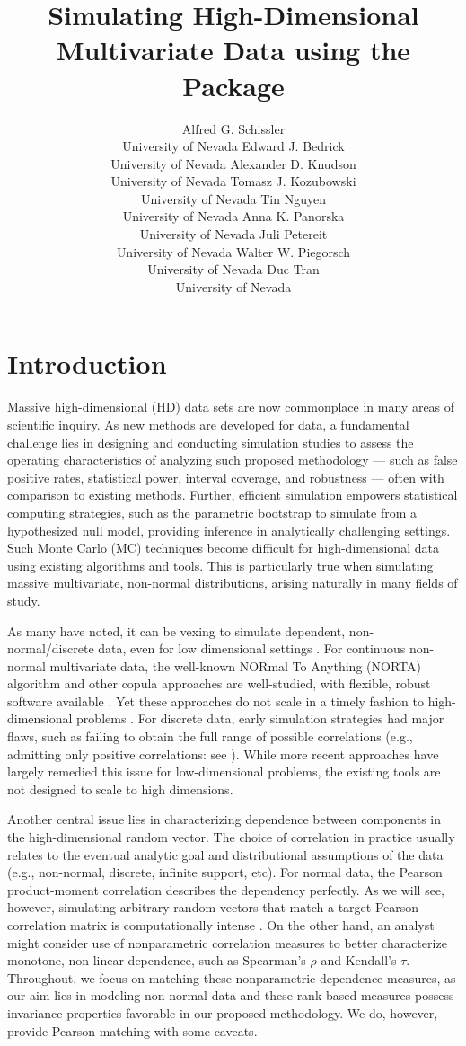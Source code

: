 \documentclass[
]{jss}
\author{
Alfred G. Schissler\\University of Nevada \And Edward J.
Bedrick\\University of Nevada \And Alexander D. Knudson\\University of
Nevada \AND Tomasz J. Kozubowski\\University of Nevada \And Tin
Nguyen\\University of Nevada \And Anna K. Panorska\\University of Nevada
\AND Juli Petereit\\University of Nevada \And Walter W.
Piegorsch\\University of Nevada \And Duc Tran\\University of Nevada
}
\title{Simulating High-Dimensional Multivariate Data using the
\pkg{Bigsimr} Package}
\begin{document}
\newpage


\hypertarget{introduction}{%
\section{Introduction}\label{introduction}}

Massive high-dimensional (HD) data sets are now commonplace in many
areas of scientific inquiry. As new methods are developed for data, a
fundamental challenge lies in designing and conducting simulation
studies to assess the operating characteristics of analyzing such
proposed methodology --- such as false positive rates, statistical
power, interval coverage, and robustness --- often with comparison to
existing methods. Further, efficient simulation empowers statistical
computing strategies, such as the parametric bootstrap
\citep{Chernick2008} to simulate from a hypothesized null model,
providing inference in analytically challenging settings. Such Monte
Carlo (MC) techniques become difficult for high-dimensional data using
existing algorithms and tools. This is particularly true when simulating
massive multivariate, non-normal distributions, arising naturally in
many fields of study.

As many have noted, it can be vexing to simulate dependent,
non-normal/discrete data, even for low dimensional settings
\citep{MB13, XZ19}. For continuous non-normal multivariate data, the
well-known NORmal To Anything (NORTA) algorithm \citep{Cario1997} and
other copula approaches \citep{Nelsen2007} are well-studied, with
flexible, robust software available \citep{Yan2007, Chen2001}. Yet these
approaches do not scale in a timely fashion to high-dimensional problems
\citep{Li2019gpu}. For discrete data, early simulation strategies had
major flaws, such as failing to obtain the full range of possible
correlations (e.g., admitting only positive correlations: see
\citet{Park1996}). While more recent approaches
\citep{MB13, Xia17, BF17} have largely remedied this issue for
low-dimensional problems, the existing tools are not designed to scale
to high dimensions.

Another central issue lies in characterizing dependence between
components in the high-dimensional random vector. The choice of
correlation in practice usually relates to the eventual analytic goal
and distributional assumptions of the data (e.g., non-normal, discrete,
infinite support, etc). For normal data, the Pearson product-moment
correlation describes the dependency perfectly. As we will see, however,
simulating arbitrary random vectors that match a target Pearson
correlation matrix is computationally intense \citep{Chen2001, Xia17}.
On the other hand, an analyst might consider use of nonparametric
correlation measures to better characterize monotone, non-linear
dependence, such as Spearman's \(\rho\) and Kendall's \(\tau\).
Throughout, we focus on matching these nonparametric dependence
measures, as our aim lies in modeling non-normal data and these
rank-based measures possess invariance properties favorable in our
proposed methodology. We do, however, provide Pearson matching with some
caveats.
\end{document}
